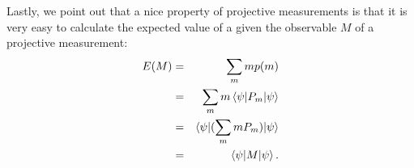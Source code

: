 Lastly, we point out that a nice property of projective measurements is that it is very easy to calculate the expected value of a given the observable $M$ of a projective measurement:
\begin{eqnarray}
E(M)&=&\sum_m mp(m)\\
&=&\sum_m m \braket{\psi|P_m|\psi}\\
&=&\braket{\psi|(\sum_m mP_m)|\psi}\\
&=&\braket{\psi|M|\psi}.
\end{eqnarray}

